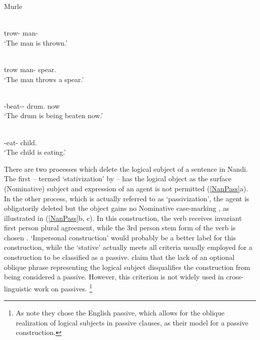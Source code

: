 \begin{exe}\ex\label{MurPass} {Murle} \citep[140, 137]{Arensen:1982}\nopagebreak[4]
\begin{xlist}
\ex\gll {} \\
trow-\pass{} man-\nom{}\\
`The man is thrown.' %

\ex\gll{}  \\
trow man-\nom{} spear.\acc{}\\
`The man throws a spear.' %
\end{xlist}
\end{exe}

\begin{exe} \citep[245]{Randal:1998}\nopagebreak[4]
\begin{xlist}
\ex\label{TenPass}\gll{} \textbf{} \\
\ipfv{}-beat-\epen{}-\pass{} drum.\nom{} now\\
`The drum is being beaten now.' 

\ex\label{TenAntiPass}\gll{} \textbf{}\\
\ipfv{}-eat-\antip{} child.\nom{}\\
`The child is eating.'  
\end{xlist}
\end{exe}

There are two processes which delete the logical subject of a sentence in Nandi. 
The first -- termed `stativization' by \citeauthor{Creider:1989} -- has the logical object as the surface (Nominative) subject and expression of an agent is not permitted (\ref{NanPass}a).
In the other process, which is actually referred to as `passivization', the agent is obligatorily deleted but the object gains no Nominative case-marking \citep[125--126]{Creider:1989}, as illustrated in (\ref{NanPass}b, c). 
In this construction, the verb receives invariant first person plural agreement, while the 3rd person stem form of the verb is chosen \citep[100]{Creider:1989}. `Impersonal construction' would probably be a better label for this construction, while the `stative' actually meets all criteria usually employed for a construction to be classified as a passive. \citet{Creider:1989} claim that the lack of an optional oblique phrase representing the logical subject disqualifies the construction from being considered a passive. 
However, this criterion is not widely used in cross-linguistic work on passives.
\footnote{As \citet[100]{Creider:1989} note they chose the English passive, which allows for the oblique realization of logical subjects in passive clauses, as their model for a passive construction.}

